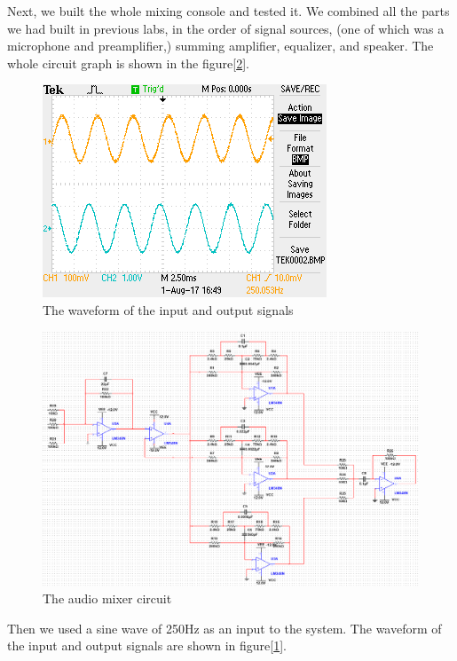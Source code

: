 Next, we built the whole mixing console and tested it.
\phantom{ } We combined all the parts we had built in previous labs, in the order of signal sources, (one of which was a microphone and preamplifier,) summing amplifier, equalizer, and speaker. The whole circuit graph is shown in the figure[\ref{fig:fullcir}].\\
\begin{figure}[!htbp]
	\centering
	\begin{framed}
		\includegraphics[width=\linewidth]{images/TEK0002.png}
		\caption{The waveform of the input and output signals}
		\label{fig:wave250}
	\end{framed}
\end{figure}

\begin{figure}[!htbp]
	\centering
	\begin{framed}
		\includegraphics[width=\linewidth]{images/circ2.png}
		\caption{The audio mixer circuit}
		\label{fig:fullcir}
	\end{framed}
\end{figure}
\phantom{ } Then we used a sine wave of 250Hz as an input to the system. The waveform of the input and output signals are shown in figure[\ref{fig:wave250}].\\


